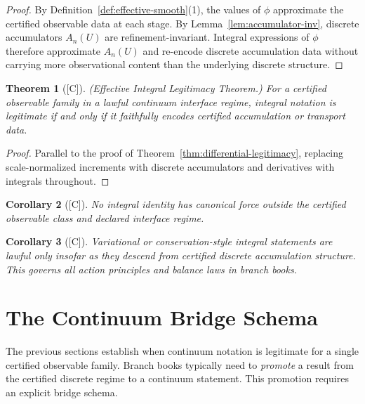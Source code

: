 \documentclass[12pt,oneside]{amsbook}
\theoremstyle{plain}
\newtheorem{theorem}{Theorem}[section]
\newtheorem{corollary}[theorem]{Corollary}
\theoremstyle{definition}
\theoremstyle{remark}
\newcommand{\status}[1]{\textup{[#1]}}
\begin{document}
\begin{proof}
By Definition~\ref{def:effective-smooth}\textup{(1)}, the values of
$\phi$ approximate the certified observable data at each stage.
By Lemma~\ref{lem:accumulator-inv}, discrete accumulators $A_n(U)$
are refinement-invariant.  Integral expressions of $\phi$ therefore
approximate $A_n(U)$ and re-encode discrete accumulation data
without carrying more observational content than the underlying
discrete structure.
\end{proof}

\begin{theorem}[\status{C}]\label{thm:integral-legitimacy}
\textup{(Effective Integral Legitimacy Theorem.)}  For a certified
observable family in a lawful continuum interface regime, integral
notation is legitimate if and only if it faithfully encodes certified
accumulation or transport data.
\end{theorem}

\begin{proof}
Parallel to the proof of Theorem~\ref{thm:differential-legitimacy},
replacing scale-normalized increments with discrete accumulators and
derivatives with integrals throughout.
\end{proof}

\begin{corollary}[\status{C}]\label{cor:no-integral-outside-regime}
No integral identity has canonical force outside the certified
observable class and declared interface regime.
\end{corollary}

\begin{corollary}[\status{C}]\label{cor:variational-from-accumulation}
Variational or conservation-style integral statements are lawful only
insofar as they descend from certified discrete accumulation structure.
This governs all action principles and balance laws in branch books.
\end{corollary}

\section{The Continuum Bridge Schema}

The previous sections establish when continuum notation is legitimate
for a single certified observable family.  Branch books typically need
to \emph{promote} a result from the certified discrete regime to a
continuum statement.  This promotion requires an explicit bridge
schema.
\end{document}
